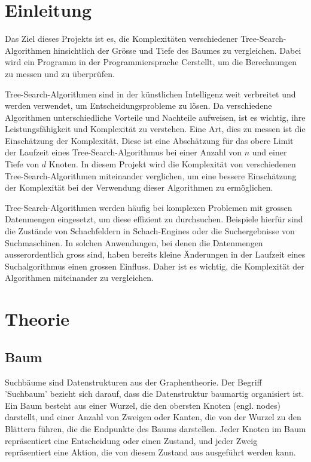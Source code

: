 \documentclass[a4paper,11pt]{article}
\newcommand{\CC}{C\nolinebreak\hspace{-.05em}\raisebox{.4ex}{\tiny\bf +}\nolinebreak\hspace{-.10em}\raisebox{.4ex}{\tiny\bf +}\hspace{.1em}}
\begin{document}
\section{Einleitung}
Das Ziel dieses Projekts ist es, die Komplexitäten verschiedener Tree-Search-Algorithmen hinsichtlich der Grösse und Tiefe des Baumes zu vergleichen. Dabei wird ein Programm in der Programmiersprache \CC erstellt, um die Berechnungen zu messen und zu überprüfen. 

Tree-Search-Algorithmen sind in der künstlichen Intelligenz weit verbreitet und werden verwendet, um Entscheidungsprobleme zu lösen. Da verschiedene Algorithmen unterschiedliche Vorteile und Nachteile aufweisen, ist es wichtig, ihre Leistungsfähigkeit und Komplexität zu verstehen. Eine Art, dies zu messen ist die Einschätzung der Komplexität. Diese ist eine Abschätzung für das obere Limit der Laufzeit eines Tree-Search-Algorithmus bei einer Anzahl von $n$ und einer Tiefe von $d$ Knoten. In diesem Projekt wird die Komplexität von verschiedenen Tree-Search-Algorithmen miteinander verglichen, um eine bessere Einschätzung der Komplexität bei der Verwendung dieser Algorithmen zu ermöglichen.

Tree-Search-Algorithmen werden häufig bei komplexen Problemen mit grossen Datenmengen eingesetzt, um diese effizient zu durchsuchen. Beispiele hierfür sind die Zustände von Schachfeldern in Schach-Engines oder die Suchergebnisse von Suchmaschinen. In solchen Anwendungen, bei denen die Datenmengen ausserordentlich gross sind, haben bereits kleine Änderungen in der Laufzeit eines Suchalgorithmus einen grossen Einfluss. Daher ist es wichtig, die Komplexität der Algorithmen miteinander zu vergleichen.
\section{Theorie}
\subsection{Baum}
Suchbäume sind Datenstrukturen aus der Graphentheorie. Der Begriff 'Suchbaum' bezieht sich darauf, dass die Datenstruktur baumartig organisiert ist. Ein Baum besteht aus einer Wurzel, die den obersten Knoten (engl. nodes) darstellt, und einer Anzahl von Zweigen oder Kanten, die von der Wurzel zu den Blättern führen, die die Endpunkte des Baums darstellen. Jeder Knoten im Baum repräsentiert eine Entscheidung oder einen Zustand, und jeder Zweig repräsentiert eine Aktion, die von diesem Zustand aus ausgeführt werden kann.
\end{document}
